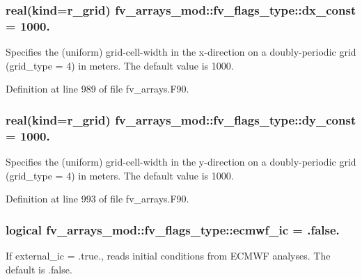 \subsubsection[{dx\-\_\-const}]{\setlength{\rightskip}{0pt plus 5cm}real(kind={\bf r\-\_\-grid}) fv\-\_\-arrays\-\_\-mod\-::fv\-\_\-flags\-\_\-type\-::dx\-\_\-const = 1000.}\label{structfv__arrays__mod_1_1fv__flags__type_a5137df19dc239f4d7eb79d396eb1a7d5}


Specifies the (uniform) grid-\/cell-\/width in the x-\/direction on a doubly-\/periodic grid (grid\-\_\-type = 4) in meters. The default value is 1000. 



Definition at line 989 of file fv\-\_\-arrays.\-F90.

\subsubsection[{dy\-\_\-const}]{\setlength{\rightskip}{0pt plus 5cm}real(kind={\bf r\-\_\-grid}) fv\-\_\-arrays\-\_\-mod\-::fv\-\_\-flags\-\_\-type\-::dy\-\_\-const = 1000.}\label{structfv__arrays__mod_1_1fv__flags__type_af64867f4de73d082ab57aab0a919e78e}


Specifies the (uniform) grid-\/cell-\/width in the y-\/direction on a doubly-\/periodic grid (grid\-\_\-type = 4) in meters. The default value is 1000. 



Definition at line 993 of file fv\-\_\-arrays.\-F90.

\subsubsection[{ecmwf\-\_\-ic}]{\setlength{\rightskip}{0pt plus 5cm}logical fv\-\_\-arrays\-\_\-mod\-::fv\-\_\-flags\-\_\-type\-::ecmwf\-\_\-ic = .false.}\label{structfv__arrays__mod_1_1fv__flags__type_a1b66904a5bb8b5264afae60f78e27090}


If external\-\_\-ic = .true., reads initial conditions from E\-C\-M\-W\-F analyses. The default is .false. 




